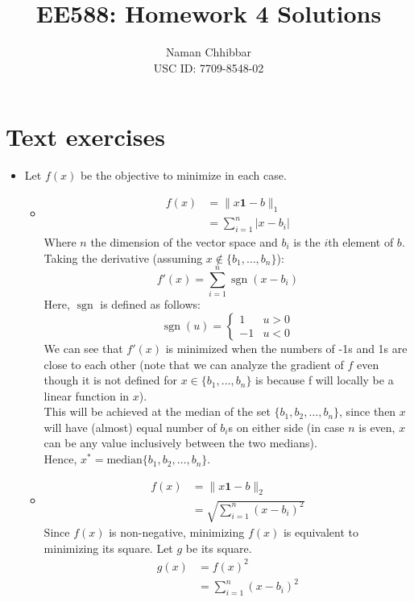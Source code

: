 \documentclass{article}
\title{EE588: Homework 4 Solutions}
\author{
  Naman Chhibbar \\
  USC ID: 7709-8548-02
}
\date{}
\DeclareMathOperator{\sgn}{sgn}
\newcommand{\1}{\mathbf{1}}
\begin{document}
\maketitle

\section{Text exercises}

\begin{itemize}
  \item[6.2] Let $f(x)$ be the objective to minimize in each case.
  \begin{itemize}
    \item[$\ell_1$-norm]
    \begin{align*}
      f(x) &= \|x \1 - b\|_1 \\
      &= \sum_{i=1}^n |x - b_i|
    \end{align*}
    Where $n$ the dimension of the vector space and $b_i$ is the $i$th element of $b$. Taking the derivative (assuming $x \notin \{b_1, \dots, b_n\}$):
    \[ f'(x) = \sum_{i=1}^n \sgn(x - b_i) \]
    Here, $\sgn$ is defined as follows:
    \[ \sgn(u) = \begin{cases} 1 & u > 0 \\ -1 & u < 0 \end{cases} \]
    We can see that $f'(x)$ is minimized when the numbers of -1s and 1s are close to each other (note that we can analyze the gradient of $f$ even though it is not defined for $x \in \{b_1, \dots, b_n\}$ is because f will locally be a linear function in $x$). \\
    This will be achieved at the median of the set $\{b_1, b_2, \dots, b_n\}$, since then $x$ will have (almost) equal number of $b_i$s on either side (in case $n$ is even, $x$ can be any value inclusively between the two medians). \\
    Hence, $x^* = \text{median}\{b_1, b_2, \dots, b_n\}$.
    \item[$\ell_2$-norm]
    \begin{align*}
      f(x) &= \|x \1 - b\|_2 \\
      &= \sqrt{\sum_{i=1}^n (x - b_i)^2}
    \end{align*}
    Since $f(x)$ is non-negative, minimizing $f(x)$ is equivalent to minimizing its square. Let $g$ be its square.
    \begin{align*}
      g(x) &= f(x)^2 \\
      &= \sum_{i=1}^n (x - b_i)^2 \\

\end{align*}
\end{itemize}
\end{itemize}
\end{document}
